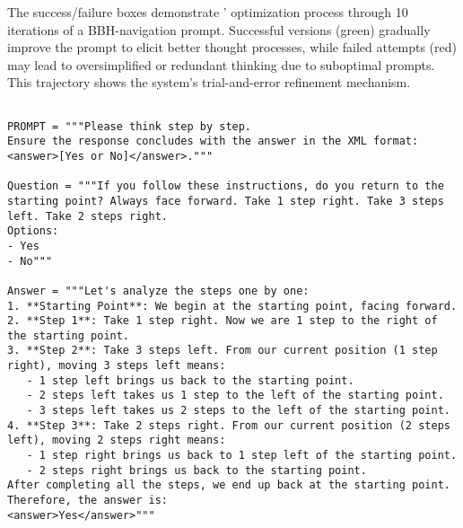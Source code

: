 The success/failure boxes demonstrate \ours' optimization process through 10 iterations of a BBH-navigation prompt. Successful versions (green) gradually improve the prompt to elicit better thought processes, while failed attempts (red) may lead to oversimplified or redundant thinking due to suboptimal prompts. This trajectory shows the system's trial-and-error refinement mechanism. 

\begin{tcolorbox}[title={\textbf{\small Optimize Function's Prompt}}, boxrule=2pt, arc=0mm, breakable]
\begin{verbatim}

PROMPT = """Please think step by step.
Ensure the response concludes with the answer in the XML format: 
<answer>[Yes or No]</answer>."""

Question = """If you follow these instructions, do you return to the starting point? Always face forward. Take 1 step right. Take 3 steps left. Take 2 steps right.
Options:
- Yes
- No"""

Answer = """Let's analyze the steps one by one:
1. **Starting Point**: We begin at the starting point, facing forward.
2. **Step 1**: Take 1 step right. Now we are 1 step to the right of the starting point.
3. **Step 2**: Take 3 steps left. From our current position (1 step right), moving 3 steps left means:
   - 1 step left brings us back to the starting point.
   - 2 steps left takes us 1 step to the left of the starting point.
   - 3 steps left takes us 2 steps to the left of the starting point.
4. **Step 3**: Take 2 steps right. From our current position (2 steps left), moving 2 steps right means:
   - 1 step right brings us back to 1 step left of the starting point.
   - 2 steps right brings us back to the starting point.
After completing all the steps, we end up back at the starting point.
Therefore, the answer is:
<answer>Yes</answer>"""


\end{verbatim}
\end{tcolorbox}

